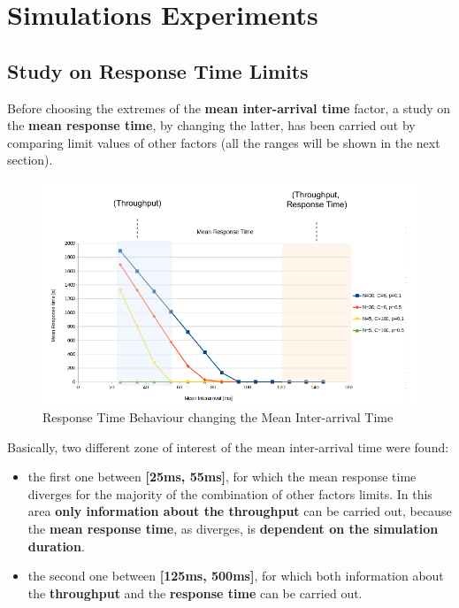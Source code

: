 \section{Simulations Experiments}
\subsection{Study on Response Time Limits}
Before choosing the extremes of the \textbf{mean inter-arrival time} factor, a study on the \textbf{mean response time}, by changing the latter, has been carried out by comparing limit values of other factors (all the ranges will be shown in the next section).  
 \begin{figure}[H]
 	\centering
 	\includegraphics[width=\textwidth]{img/BufferExplosion.pdf}
 	\caption{Response Time Behaviour changing the Mean Inter-arrival Time}
 	\label {img: warmUp}
 \end{figure}
\noindent Basically, two different zone of interest of the mean inter-arrival time were found: 
\begin{itemize}
	\item the first one between \textbf{[25ms, 55ms]}, for which the mean response time diverges for the majority of the combination of other factors limits. In this area \textbf{only information about the throughput} can be carried out, because the \textbf{mean response time}, as diverges, is \textbf{dependent on the simulation duration}.
	\item the second one between \textbf{[125ms, 500ms]}, for which both information about the \textbf{throughput} and the \textbf{response time} can be carried out.
	
\end{itemize}

